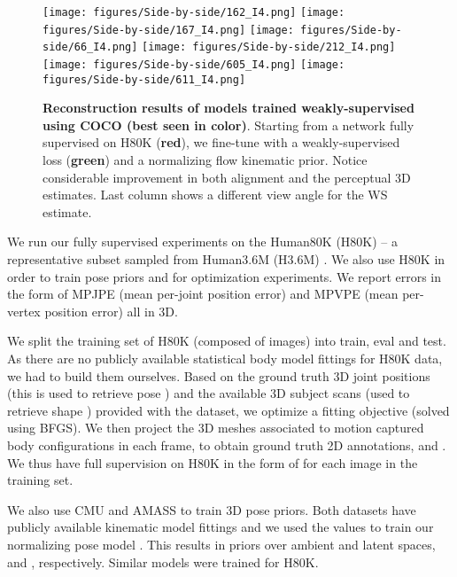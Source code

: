 \documentclass[runningheads]{llncs}
\begin{document}
\begin{figure*}[!htbp]
\begin{center}
        \texttt{[image: figures/Side-by-side/162\_I4.png]}
        \texttt{[image: figures/Side-by-side/167\_I4.png]}
        \texttt{[image: figures/Side-by-side/66\_I4.png]}
        \texttt{[image: figures/Side-by-side/212\_I4.png]}
        \texttt{[image: figures/Side-by-side/605\_I4.png]}
        \texttt{[image: figures/Side-by-side/611\_I4.png]}        
\end{center}
\caption{\textbf{Reconstruction results of models trained weakly-supervised using COCO (best seen in color)}. Starting from a network fully supervised on H80K (\textbf{red}), we fine-tune with a weakly-supervised loss (\textbf{green}) and a normalizing flow kinematic prior. Notice considerable improvement in both alignment and the perceptual 3D estimates. Last column shows a different view angle for the WS estimate.}
\label{fig:side-by-side}
\end{figure*}

 We run our fully supervised experiments on the Human80K (H80K) -- a representative subset sampled from Human3.6M (H3.6M) \cite{Ionescu14pami}. We also use H80K in order to train pose priors and for optimization experiments. We report errors in the form of MPJPE (mean per-joint position error) and MPVPE (mean per-vertex position error) all in 3D.

We split the training set of H80K (composed of  images) into train, eval and test. As there are no publicly available statistical body model fittings for H80K data, we had to build them ourselves. Based on the ground truth 3D joint positions  (this is used to retrieve pose ) and the available 3D subject scans (used to retrieve shape ) provided with the dataset, we optimize a fitting objective (solved using BFGS). We then project the 3D meshes associated to motion captured body configurations in each frame, to obtain ground truth 2D annotations,  and . We thus have full supervision on H80K in the form of  for each image in the training set.

We also use CMU \cite{cmu2018} and AMASS \cite{mahmood2019amass} to train 3D pose priors. Both datasets have publicly available kinematic model fittings and we used the  values to train our normalizing pose model . This results in priors over ambient and latent spaces,  and , respectively. Similar models were trained for H80K. 
\end{document}

